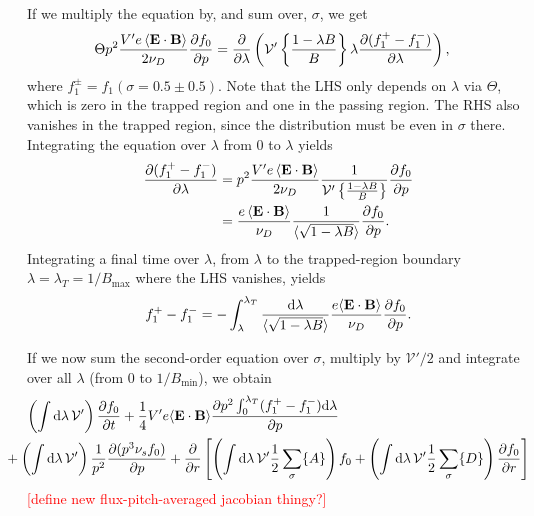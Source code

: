 \documentclass[11pt,a4paper]{article}
\newcommand{\rd}{\ensuremath{\mathrm{d}}}
\newcommand{\sub}[1]{\ensuremath{_{\text{#1}}}}
\renewcommand{\b}[1]{\ensuremath{ {\bf #1 } }}
\begin{document}
If we multiply the equation by, and sum over, $\sigma$, we get
\begin{align}
\Theta  p^2\frac{V'e \left\langle \b{E}\cdot\b{B}\right\rangle}{2\nu_D}\frac{\partial  f_0}{\partial p } &=  \frac{\partial}{\partial \lambda}\left(  \mathcal{V'}\left\{\frac{1-\lambda B}{B}\right\} \lambda\frac{\partial( f_1^+ - f_1^-)}{\partial \lambda}\right), 
\end{align} 
where $f_1^{\pm} = f_1(\sigma = 0.5\pm0.5)$.
Note that the LHS only depends on $\lambda$ via $\Theta$, which is zero in the trapped region and one in the passing region. The RHS also vanishes in the trapped region, since the distribution must be even in $\sigma$ there. Integrating the equation over $\lambda$ from 0 to $\lambda$ yields
\begin{align}
\frac{\partial (f_1^+-f_1^-)}{\partial \lambda} &=  p^2\frac{V'e \left\langle \b{E}\cdot\b{B}\right\rangle}{2\nu_D}\frac{1}{\mathcal{V}' \left\{\frac{1-\lambda B}{B}\right\}}\frac{\partial f_0}{\partial p } \nonumber \\
&= \frac{e \left\langle \b{E}\cdot\b{B}\right\rangle}{\nu_D}\frac{1}{\langle \sqrt{1-\lambda B}\rangle} \frac{\partial f_0}{\partial p}.
\end{align}
Integrating a final time over $\lambda$, from $\lambda$ to the trapped-region boundary $\lambda=\lambda_T = 1/B\sub{max}$ where the LHS vanishes, yields
\begin{align}
f_1^+-f_1^- = -\int_\lambda^{\lambda_T} \frac{\rd \lambda}{\langle\sqrt{1-\lambda B}\rangle} \frac{ e \langle \b{E}\cdot\b{B}\rangle}{\nu_D}\frac{\partial f_0}{\partial p}.
\end{align}

If we now sum the second-order equation over $\sigma$, multiply by $\mathcal{V}'/2$ and integrate over all $\lambda$ (from 0 to $1/B\sub{min}$), we obtain
\begin{align}
\left(\int \rd \lambda \, \mathcal{V}' \right)\frac{\partial f_0}{\partial t} &+\frac{1}{4} V' e\langle \b{E}\cdot\b{B}\rangle \frac{\partial p^2\int_0^{\lambda_T}(f_1^+-f_1^-)\rd\lambda}{\partial p}\nonumber \\
&\hspace{-30mm}+\left(\int \rd \lambda \, \mathcal{V}' \right)\frac{1}{p^2}\frac{\partial(p^3 \nu_s f_0)}{\partial p} +\frac{\partial}{\partial r}\left[ \left(\int \rd \lambda \, \mathcal{V}' \frac{1}{2}\sum_\sigma\{A\}\right)f_0+  \left(\int \rd \lambda \, \mathcal{V}' \frac{1}{2}\sum_\sigma\{D\}\right)\frac{\partial f_0}{\partial r}\right]
\end{align}
\textcolor{red}{[define new flux-pitch-averaged jacobian thingy?]}
\end{document}
